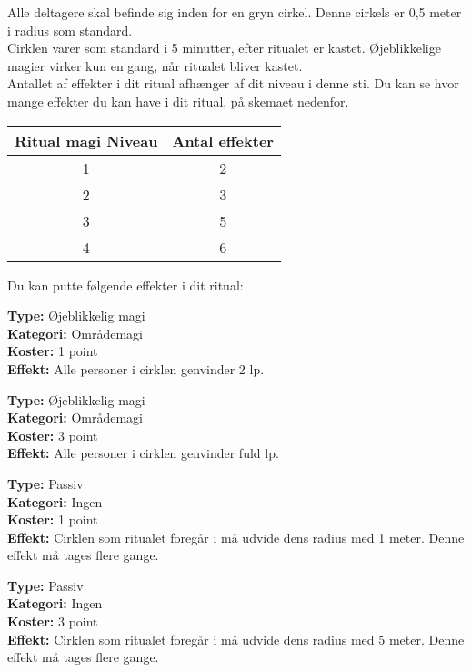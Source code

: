 Alle deltagere skal befinde sig inden for en gryn cirkel. Denne cirkels er 0,5 meter i radius som standard.\\
Cirklen varer som standard i 5 minutter, efter ritualet er kastet. Øjeblikkelige magier virker kun en gang, når ritualet bliver kastet.\\
Antallet af effekter i dit ritual afhænger af dit niveau i denne sti. Du kan se hvor mange effekter du kan have i dit ritual, på skemaet nedenfor.
\begin{table}[H]
    \centering
    \begin{tabular}{|c|c|}
    \rowcolor{cerulean!80}\hline
        Ritual magi Niveau & Antal effekter \\\hline
        1&2\\\hline
        2&3\\\hline
        3&5\\\hline
        4&6\\\hline
    \end{tabular}
\end{table}

Du kan putte følgende effekter i dit ritual:
\begin{ritual*}[Helbredelse 1]
\textbf{Type:} Øjeblikkelig magi\\
\textbf{Kategori:} Områdemagi\\
\textbf{Koster:} 1 point\\
\textbf{Effekt:} Alle personer i cirklen genvinder 2 lp.
\end{ritual*}

\begin{ritual*}[Helbredelse 2]
\textbf{Type:} Øjeblikkelig magi\\
\textbf{Kategori:} Områdemagi\\
\textbf{Koster:} 3 point\\
\textbf{Effekt:} Alle personer i cirklen genvinder fuld lp.
\end{ritual*}

\begin{ritual*}
\textbf{Type:} Passiv\\
\textbf{Kategori:} Ingen\\
\textbf{Koster:} 1 point\\
\textbf{Effekt:} Cirklen som ritualet foregår i må udvide dens radius med 1 meter. Denne effekt må tages flere gange.
\end{ritual*}

\begin{ritual*}
\textbf{Type:} Passiv\\
\textbf{Kategori:} Ingen\\
\textbf{Koster:} 3 point\\
\textbf{Effekt:} Cirklen som ritualet foregår i må udvide dens radius med 5 meter. Denne effekt må tages flere gange.
\end{ritual*}

